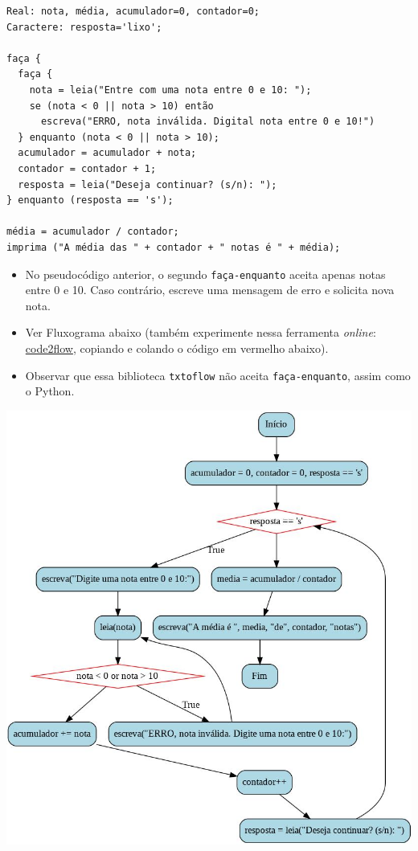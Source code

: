 \documentclass[12pt,a4paper]{article}
\providecommand{\tightlist}{%
      \setlength{\itemsep}{0pt}\setlength{\parskip}{0pt}}
\begin{document}
\begin{verbatim}
Real: nota, média, acumulador=0, contador=0;
Caractere: resposta='lixo';

faça {
  faça {
    nota = leia("Entre com uma nota entre 0 e 10: ");
    se (nota < 0 || nota > 10) então 
      escreva("ERRO, nota inválida. Digital nota entre 0 e 10!")
  } enquanto (nota < 0 || nota > 10); 
  acumulador = acumulador + nota;
  contador = contador + 1;
  resposta = leia("Deseja continuar? (s/n): ");
} enquanto (resposta == 's');

média = acumulador / contador;
imprima ("A média das " + contador + " notas é " + média);
\end{verbatim}

    \begin{itemize}
\tightlist
\item
  No pseudocódigo anterior, o segundo \texttt{faça-enquanto} aceita
  apenas notas entre 0 e 10. Caso contrário, escreve uma mensagem de
  erro e solicita nova nota.
\end{itemize}

    \begin{itemize}
\item
  Ver Fluxograma abaixo (também experimente nessa ferramenta
  \emph{online}: \href{https://app.code2flow.com/}{code2flow}, copiando
  e colando o código em vermelho abaixo).
\item
  Observar que essa biblioteca \texttt{txtoflow} não aceita
  \texttt{faça-enquanto}, assim como o Python.
\end{itemize}

\includegraphics{"figs/flowchartCap4b.png"}
\end{document}
